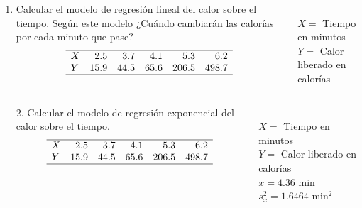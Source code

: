 \documentclass[aspectratio=149,10pt,xcolor=dvipsnames,t]{beamer}
\begin{document}
\begin{frame}
\begin{columns}
\begin{column}[T]{0.65\textwidth}
\begin{enumerate}
\item Calcular el modelo de regresión lineal del calor sobre el tiempo. 
Según este modelo ¿Cuándo cambiarán las calorías por cada minuto que pase?
\[
\begin{array}{lrrrrr}
\hline
X & 2.5 & 3.7 & 4.1 & 5.3 & 6.2 \\
Y & 15.9 & 44.5 & 65.6 & 206.5 & 498.7\\
\hline
\end{array}
\]
\end{enumerate}
\end{column}
\begin{column}[T]{0.35\textwidth}
\\
$X=$ Tiempo en minutos\\
$Y=$ Calor liberado en calorías
\end{column}
\end{columns}
\end{frame}


\begin{frame}
\begin{columns}
\begin{column}[T]{0.65\textwidth}
\begin{enumerate}
\item[2.] Calcular el modelo de regresión exponencial del calor sobre el tiempo.
\[
\begin{array}{lrrrrr}
\hline
X & 2.5 & 3.7 & 4.1 & 5.3 & 6.2 \\
Y & 15.9 & 44.5 & 65.6 & 206.5 & 498.7\\
\hline
\end{array}
\]
\end{enumerate}
\end{column}
\begin{column}[T]{0.35\textwidth}
\\
$X=$ Tiempo en minutos\\
$Y=$ Calor liberado en calorías\\
$\bar x = 4.36$ min\\
$s_x^2=1.6464$ min$^2$
\end{column}
\end{columns}
\end{frame}
\end{document}
